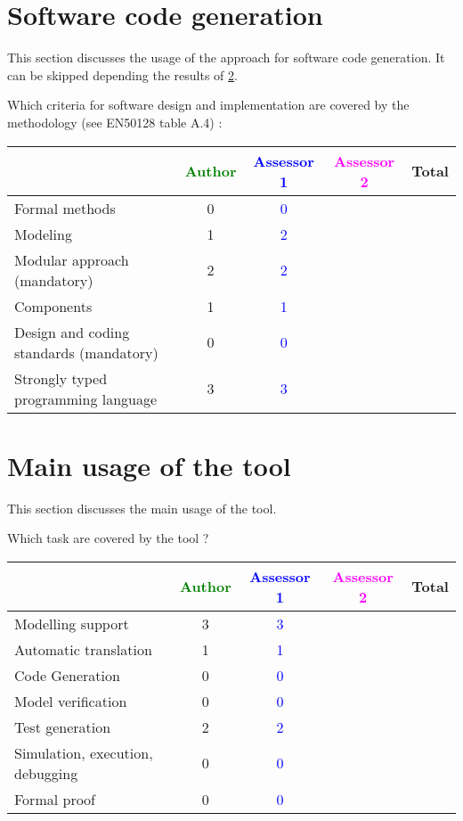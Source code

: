 \section{Software code generation}
This section discusses the usage of the approach for software code generation.
It can be skipped depending the results of \ref{main_usage}.

Which criteria for software design and implementation are covered by the methodology
(see EN50128 table A.4) :

\begin{tabular}{|l | c | c | c | c|}
\hline
& \textcolor{green}{Author} & \textcolor{blue}{Assessor 1} & \textcolor{magenta}{Assessor 2} & Total \\
\hline
Formal methods & 0 & \textcolor{blue}{0} & & \\
\hline
Modeling & 1 & \textcolor{blue}{2} & & \\
\hline
Modular approach (mandatory) & 2 & \textcolor{blue}{2} & & \\
\hline
Components & 1 & \textcolor{blue}{1} & & \\
\hline
Design and coding standards (mandatory) & 0 & \textcolor{blue}{0} & & \\
\hline
Strongly typed programming language & 3 & \textcolor{blue}{3} & & \\
\hline
\end{tabular}

\section{Main usage of the tool}
\label{main_usage}

This section discusses the main usage of the tool.

Which task are covered by the tool ?


\begin{tabular}{|l | c | c | c | c|}
\hline
& \textcolor{green}{Author} & \textcolor{blue}{Assessor 1} & \textcolor{magenta}{Assessor 2} & Total \\
\hline
Modelling support & 3 & \textcolor{blue}{3} & & \\
\hline
Automatic translation & 1 & \textcolor{blue}{1} & & \\
\hline
Code Generation & 0 & \textcolor{blue}{0} & & \\
\hline
Model verification & 0 & \textcolor{blue}{0} & & \\
\hline
Test generation & 2 & \textcolor{blue}{2} & & \\
\hline
Simulation, execution, debugging & 0 & \textcolor{blue}{0} & & \\
\hline
Formal proof & 0 & \textcolor{blue}{0} & & \\
\hline
\end{tabular}

